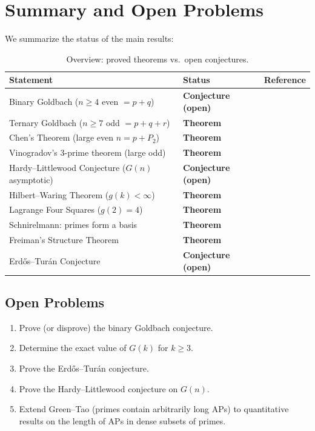 \documentclass[12pt,a4paper]{amsart}
\theoremstyle{definition}
\begin{document}
\section{Summary and Open Problems}\label{sec:summary}

We summarize the status of the main results:

\begin{table}[h]
\centering
\begin{tabular}{@{}p{6.5cm}ll@{}}
\toprule
Statement & Status & Reference \\
\midrule
Binary Goldbach ($n \geq 4$ even $= p + q$) &
  \textbf{Conjecture (open)} & \cite{Goldbach1742} \\
Ternary Goldbach ($n \geq 7$ odd $= p+q+r$) &
  \textbf{Theorem} & \cite{Helfgott2013} \\
Chen's Theorem (large even $n = p + P_2$) &
  \textbf{Theorem} & \cite{Chen1973} \\
Vinogradov's 3-prime theorem (large odd) &
  \textbf{Theorem} & \cite{Vinogradov1937} \\
Hardy--Littlewood Conjecture ($G(n)$ asymptotic) &
  \textbf{Conjecture (open)} & \cite{HardyLittlewood1923} \\
Hilbert--Waring Theorem ($g(k) < \infty$) &
  \textbf{Theorem} & \cite{Hilbert1909} \\
Lagrange Four Squares ($g(2) = 4$) &
  \textbf{Theorem} & \cite{Lagrange1770} \\
Schnirelmann: primes form a basis &
  \textbf{Theorem} & \cite{Schnirelmann1930} \\
Freiman's Structure Theorem &
  \textbf{Theorem} & \cite{Freiman1973} \\
Erd\H{o}s--Tur\'{a}n Conjecture &
  \textbf{Conjecture (open)} & \cite{ErdosTuran1941} \\
\bottomrule
\end{tabular}
\caption{Overview: proved theorems vs.\ open conjectures.}
\label{tab:status}
\end{table}

\subsection*{Open Problems}
\begin{enumerate}[label=(\arabic*)]
\item Prove (or disprove) the binary Goldbach conjecture.
\item Determine the exact value of $G(k)$ for $k \geq 3$.
\item Prove the Erd\H{o}s--Tur\'{a}n conjecture.
\item Prove the Hardy--Littlewood conjecture on $G(n)$.
\item Extend Green--Tao (primes contain arbitrarily long APs) to
      quantitative results on the length of APs in dense subsets of primes.
\end{enumerate}
\end{document}
